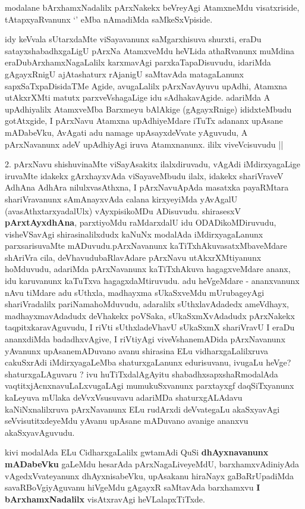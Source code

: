 \begin{center}
\end{center}
\begin{artha}
modalane bArxhamxNadalilx pArxNakekx beVreyAgi AtamxneMdu
visatxriside, tAtapxyaRvanunx `\stext' eMba nAmadiMda
saMkeSxVpiside. 

idy keVvala sUtarxdaMte viSayavanunx saMgarxhisuva shurxti, eraDu
satayxshabadhxgaLigU pArxNa AtamxveMdu heVLida athaRvanunx muMdina
eraDubArxhamxNagaLalilx karxmavAgi parxkaTapaDisuvudu, idariMda
gAgayxRnigU ajAtashaturx rAjanigU saMtavAda matagaLanunx
sapxSaTxpaDisidaTMe Agide, avugaLalilx pArxNavAyuvu upAdhi, Atamxna
utAkxrXMti matutx parxveVshagaLige idu sAdhakavAgide. adariMda A
upAdhiyalilx AtamxveMba Barxmeyu bAlAkige (gAgayxRnige) ididxteMbudu
gotAtxgide, I pArxNavu Atamxna upAdhiyeMdare iTuTx adananx upAsane
mADabeVku, AvAgati adu namage upAsayxdeVvate yAguvudu, A pArxNavanunx
adeV upAdhiyAgi iruva Atamxnanunx. ililx viveVcisuvudu ||
\end{artha}


\begin{center}
\end{center}

\begin{artha}
2. pArxNavu shishuvinaMte viSayAsakitx ilalxdiruvadu, vAgAdi
iMdirxyagaLige iruvaMte idakekx gArxhayxvAda viSayaveMbudu ilalx,
idakekx shariVraveV AdhAna  AdhAra nilulxvasAthxna, I pArxNavuApAda
masatxka payaRMtara shariVravanunx sAmAnayxvAda calana kirxyeyiMda
yAvAgalU (avasAthxtarxyadalUlx) vAyxpisikoMDu ADisuvudu. shirasesxV
\textbf{pArxtAyxdhAna}, parxtiyoMdu raMdarxdalU idu ODADikoMDiruvudu,
visheVSavAgi shirasinalilxdudx kaNuNx modalAda iMdirxyagaLanunx
parxsarisuvaMte mADuvudu.pArxNavanunx kaTiTxhAkuvasatxMbaveMdare
shAriVra cila, deVhavudubaRlavAdare pArxNavu utAkxrXMtiyanunx
hoMduvudu, adariMda pArxNavanunx kaTiTxhAkuva hagagxveMdare ananx, idu
karuvanunx kaTuTxva hagagxdaMtiruvudu. adu heVgeMdare - ananxvanunx
nAvu tiMdare adu sUthxla, madhayxma sUkaSxveMdu mUrubageyAgi
shariVradalilx pariNamahoMduvudu, adaralilx sUthxlavAdadedx ameVdhayx,
madhayxmavAdadudx deVhakekx poVSaka, sUkaSxmXvAdadudx pArxNakekx
taqpitxkaravAguvudu, I riVti sUthxladeVhavU  sUkaSxmX shariVravU I
eraDu ananxdiMda badadhxvAgive, I riVtiyAgi viveVshanemADida
pArxNavanunx yAvanunx upAsanemADuvano avanu shirasina ELu
vidharxgaLalilxruva cakuSxrAdi iMdirxyagaLeMba shaturxgaLanunx
edurisuvanu, ivugaLu heVge? shaturxgaLAguvaru ? ivu huTiTxdalAgAyitu
shabadhxsapxshaRmodalAda vaqtitxjAcnxnavuLaLxvugaLAgi mumukuSxvanunx
parxtayxgf daqSiTxyanunx kaLeyuva mUlaka deVvxVsusuvavu adariMDa
shaturxgALAdavu kaNiNxnalilxruva pArxNavanunx ELu rudArxdi deVvategaLu
akaSxyavAgi  seVvisutitxdeyeMdu yAvanu upAsane mADuvano avanige
ananxvu akaSxyavAguvudu.

kivi modalAda ELu CidharxgaLalilx gwtamAdi QuSi \textbf{dhAyxnavanunx mADabeVku}
gaLeMdu hesarAda pArxNagaLiveyeMdU, barxhamxvAdiniyAda
vAgedxVvateyanunx dhAyxnisabeVku, upAsakanu hiraNayx gaBaRrUpadiMda
savaRBoVgiyAguvanu hiVgeMdu gAgayxR saMtavAda barxhamxvu \textbf{I bArxhamxNadalilx} 
visAtxravAgi heVLalapxTiTxde.
\end{artha}


